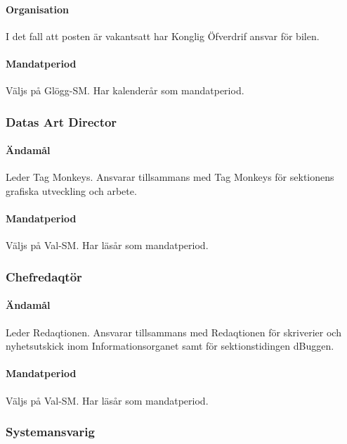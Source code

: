\documentclass{dgovdoc}
\begin{document}
\paragraph{Organisation}

I det fall att posten är vakantsatt har Konglig Öfverdrif ansvar för bilen.

\paragraph{Mandatperiod}

Väljs på Glögg-SM. Har kalenderår som mandatperiod.

\subsubsection{Datas Art Director}

\paragraph{Ändamål}
Leder Tag Monkeys. Ansvarar tillsammans med Tag Monkeys för sektionens
grafiska utveckling och arbete.

\paragraph{Mandatperiod}

Väljs på Val-SM. Har läsår som mandatperiod.

\subsubsection{Chefredaqtör}

\paragraph{Ändamål}
Leder Redaqtionen. Ansvarar tillsammans med Redaqtionen för skriverier och
nyhetsutskick inom Informationsorganet samt för sektionstidingen dBuggen.

\paragraph{Mandatperiod}
Väljs på Val-SM. Har läsår som mandatperiod.

\subsubsection{Systemansvarig}
\end{document}
